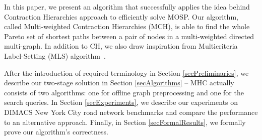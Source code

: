 
In this paper, we present an algorithm that successfully applies the idea behind Contraction Hierarchies approach to efficiently solve MOSP. Our algorithm, called Multi-weighted Contraction Hierarchies (MCH), is able to find the whole Pareto set of shortest paths between a pair of nodes in a multi-weighted directed multi-graph. In addition to CH, we also draw inspiration from Multicriteria Label-Setting (MLS) algorithm~\cite{martins1984multicriteria}. 








After the introduction of required terminology in Section \ref{secPreliminaries}, we describe our two-stage solution in Section \ref{secAlgorithms} -- MHC actually consists of two algorithms: one for offline graph preprocessing and one for the search queries. In Section \ref{secExperiments}, we describe our experiments on DIMACS New York City road network benchmarks and compare the performance to an alternative approach. Finally, in Section \ref{secFormalResults}, we formally prove our algorithm's correctness.

